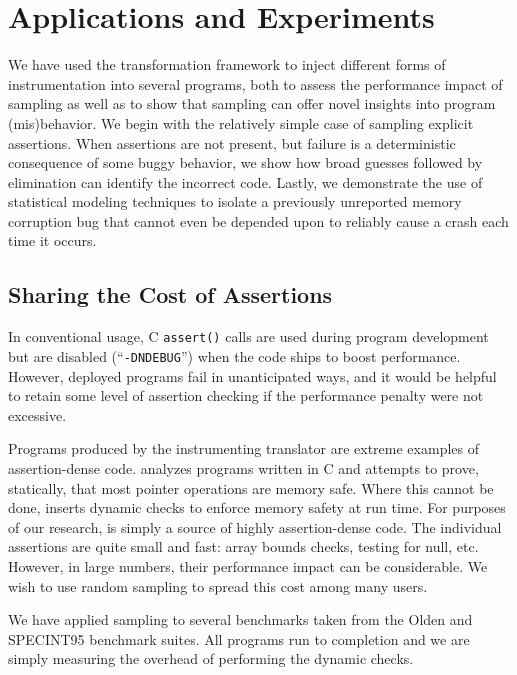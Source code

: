 \section{Applications and Experiments}
\label{sec:applications}

We have used the transformation framework to inject different forms of
instrumentation into several programs, both to assess the performance
impact of sampling as well as to show that sampling can offer novel
insights into program (mis)behavior.  We begin with the relatively
simple case of sampling explicit assertions.  When assertions are not
present, but failure is a deterministic consequence of some buggy
behavior, we show how broad guesses followed by elimination can
identify the incorrect code.  Lastly, we demonstrate the use of
statistical modeling techniques to isolate a previously unreported
memory corruption bug that cannot even be depended upon to reliably
cause a crash each time it occurs.

\subsection{Sharing the Cost of Assertions}
\label{sec:ccured}

In conventional usage, C \texttt{assert()} calls are used during
program development but are disabled (``\texttt{-DNDEBUG}'') when the
code ships to boost performance.  However, deployed programs fail in
unanticipated ways, and it would be helpful to retain some level of
assertion checking if the performance penalty were not excessive.

Programs produced by the \CCured instrumenting translator
\cite{POPL_'02*128} are extreme examples of assertion-dense code.
\CCured analyzes programs written in C and attempts to prove,
statically, that most pointer operations are memory safe.  Where this
cannot be done, \CCured inserts dynamic checks to enforce memory
safety at run time.  For purposes of our research, \CCured is simply a
source of highly assertion-dense code.  The individual assertions are
quite small and fast: array bounds checks, testing for null, etc.
However, in large numbers, their performance impact can be
considerable.  We wish to use random sampling to spread this cost
among many users.

We have applied sampling to several benchmarks taken from the Olden
\cite{Carlisle:1996:OPPWDDSDMM} and SPECINT95 \cite{SPEC95} benchmark
suites.  All programs run to completion and we are simply measuring
the overhead of performing the dynamic checks.

